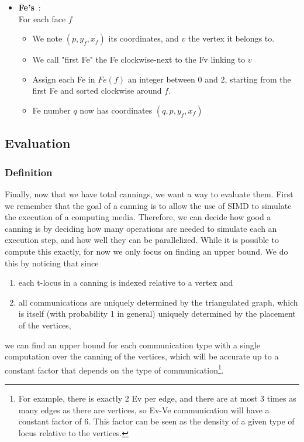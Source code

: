 \documentclass{article}
\begin{document}
\begin{itemize}
	\item \textbf{Fe's}~:\\
	For each face $f$ 
	\begin{itemize}[noitemsep, nosep, label=-]
		\item We note $(p, y_f, x_f)$ its coordinates, and $v$ the vertex it belongs to.
		\item We call "first Fe" the Fe clockwise-next to the Fv linking to $v$
		\item Assign each Fe in $Fe(f)$ an integer between 0 and 2, starting from the first Fe and sorted clockwise around $f$.
		\item Fe number $q$ now has coordinates $(q, p, y_f, x_f)$
	\end{itemize}
\end{itemize}

\subsection{Evaluation}

\subsubsection{Definition}

\newcommand{\footnoteConstantFactor}{
	For example, there is exactly 2 Ev per edge, and there are at most 3 times as many edges as there are vertices, so Ev-Ve communication will have a constant factor of 6. This factor can be seen as the density of a given type of locus relative to the vertices.
}

Finally, now that we have total cannings, we want a way to evaluate them. First we remember that the goal of a canning is to allow the use of SIMD to simulate the execution of a computing media. Therefore, we can decide how good a canning is by deciding how many operations are needed to simulate each an execution step, and how well they can be parallelized. While it is possible to compute this exactly, for now we only focus on finding an upper bound. We do this by noticing that since
\begin{enumerate}
	\item each t-locus in a canning is indexed relative to a vertex and
	\item all communications are uniquely determined by the triangulated graph, which is itself (with probability 1 in general) uniquely determined by the placement of the vertices,
\end{enumerate}
we can find an upper bound for each communication type with a single computation over the canning of the vertices, which will be accurate up to a constant factor that depends on the type of communication\footnote{\footnoteConstantFactor}.
\end{document}
